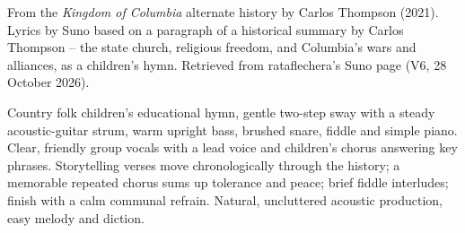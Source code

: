 
\begin{notes}
From the \emph{Kingdom of Columbia} alternate history by Carlos Thompson (2021). Lyrics by Suno based on a paragraph of a historical summary by Carlos Thompson -- the state church, religious freedom, and Columbia's wars and alliances, as a children's hymn. Retrieved from rataflechera's Suno page (V6, 28 October 2026).
\end{notes}
\begin{style}
Country folk children’s educational hymn, gentle two-step sway with a steady acoustic-guitar strum, warm upright bass, brushed snare, fiddle and simple piano. Clear, friendly group vocals with a lead voice and children’s chorus answering key phrases. Storytelling verses move chronologically through the history; a memorable repeated chorus sums up tolerance and peace; brief fiddle interludes; finish with a calm communal refrain. Natural, uncluttered acoustic production, easy melody and diction.
\end{style}
